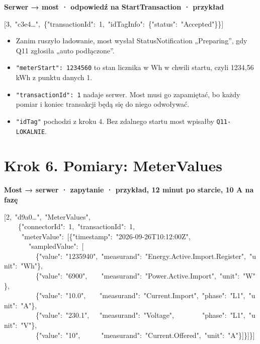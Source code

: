\documentclass[11pt,a4paper]{article}
\begin{document}
\textbf{Serwer {\symbolfont→} most · odpowiedź na StartTransaction ·  przykład}


\begin{kodbox}
\mbox{}[3,\ "c3e4…",\ \{"transactionId":\ 1,\ "idTagInfo":\ \{"status":\ "Accepted"\}\}]
\end{kodbox}

\begin{itemize}
\item Zanim ruszyło ładowanie, most wysłał StatusNotification „Preparing”, gdy Q11 zgłosiła „auto podłączone”.
\item \texttt{"meterStart":\allowbreak{} 1234560} to stan licznika w Wh w chwili startu, czyli 1234,56 kWh z punktu danych 1.
\item \texttt{"transactionId":\allowbreak{} 1} nadaje serwer. Most musi go zapamiętać, bo każdy pomiar i koniec transakcji będą się do niego odwoływać.
\item \texttt{"idTag"} pochodzi z kroku 4. Bez zdalnego startu most wpisałby \texttt{Q11-LOKALNIE}.
\end{itemize}

\section*{Krok 6. Pomiary: MeterValues}

\textbf{Most {\symbolfont→} serwer · zapytanie ·  przykład, 12 minut po starcie, 10 A na fazę}


\begin{kodbox}
\mbox{}[2,\ "d9a0…",\ "MeterValues",\\
\mbox{}\ \ \ \ \{"connectorId":\ 1,\ "transactionId":\ 1,\\
\mbox{}\ \ \ \ \ "meterValue":\ [\{"timestamp":\ "2026-09-26T10:12:00Z",\\
\mbox{}\ \ \ \ \ \ \ "sampledValue":\ [\\
\mbox{}\ \ \ \ \ \ \ \ \ \{"value":\ "1235940",\ "measurand":\ "Energy.Active.Import.Register",\ "unit":\ "Wh"\},\\
\mbox{}\ \ \ \ \ \ \ \ \ \{"value":\ "6900",\ \ \ \ "measurand":\ "Power.Active.Import",\ "unit":\ "W"\},\\
\mbox{}\ \ \ \ \ \ \ \ \ \{"value":\ "10.0",\ \ \ \ "measurand":\ "Current.Import",\ "phase":\ "L1",\ "unit":\ "A"\},\\
\mbox{}\ \ \ \ \ \ \ \ \ \{"value":\ "230.1",\ \ \ "measurand":\ "Voltage",\ \ \ \ \ \ \ \ "phase":\ "L1",\ "unit":\ "V"\},\\
\mbox{}\ \ \ \ \ \ \ \ \ \{"value":\ "10",\ \ \ \ \ \ "measurand":\ "Current.Offered",\ "unit":\ "A"\}]\}]\}]
\end{kodbox}
\end{document}
